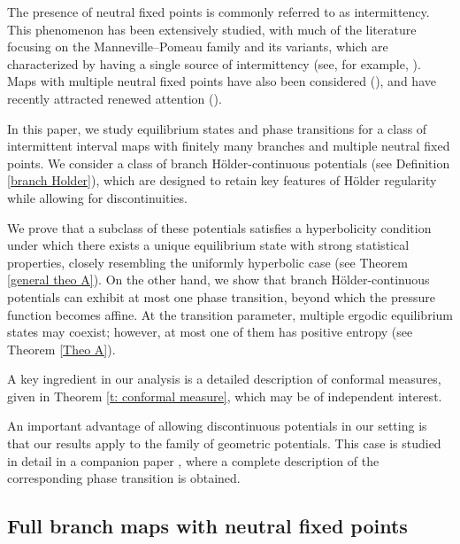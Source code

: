 \documentclass[12pt]{amsart}
\numberwithin{equation}{section} %
\numberwithin{figure}{section} %
\theoremstyle{plain}
\theoremstyle{definition}
\theoremstyle{remark}
\theoremstyle{citing}
\renewcommand{\=}{\coloneqq}
\begin{document}
The presence of neutral fixed points is commonly referred to as intermittency. This phenomenon has been extensively studied, with much of the literature focusing on the Manneville--Pomeau family and its variants, which are characterized by having a single source of intermittency (see, for example, \cite{BaladiTodd,BruinTerhesiuTodd,CastroVarandas,ClimenhagaThompson,coronelRivera1,coronelRivera2,GaribaldiInoquio1,GaribaldiInoquio2,Gouzel2,Holland,LiRivera2,Liverani,MelbourneTerhesiu,PollicottWeiss,PrellbergSlawny,Sarig1,Sarig2}). Maps with multiple neutral fixed points have also been considered (\cite{MelbourneTerhesiu,Thaler1,Thaler2,Thaler3,zweimuller1,zweimuller2}), and have recently attracted renewed attention (\cite{coatesGelfert,coatesMelbourne,CoatesMelbourneTalebi,coatesLuzzatto,coatesLuzzattoMubarak}).

In this paper, we study equilibrium states and phase transitions for a class of intermittent interval maps with finitely many branches and multiple neutral fixed points. We consider a class of branch Hölder-continuous potentials (see Definition \ref{branch Holder}), which are designed to retain key features of Hölder regularity while allowing for discontinuities.

We prove that a subclass of these potentials satisfies a hyperbolicity condition under which there exists a unique equilibrium state with strong statistical properties, closely resembling the uniformly hyperbolic case (see Theorem \ref{general theo A}). On the other hand, we show that branch Hölder-continuous potentials can exhibit at most one phase transition, beyond which the pressure function becomes affine. At the transition parameter, multiple ergodic equilibrium states may coexist; however, at most one of them has positive entropy (see Theorem \ref{Theo A}).

A key ingredient in our analysis is a detailed description of conformal measures, given in Theorem \ref{t: conformal measure}, which may be of independent interest.

An important advantage of allowing discontinuous potentials in our setting is that our results apply to the family of geometric potentials. This case is studied in detail in a companion paper \cite{CoronelMonardes}, where a complete description of the corresponding phase transition is obtained.

\subsection{Full branch maps with neutral fixed points}
\end{document}
